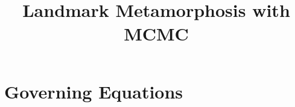 \documentclass{article}
\begin{document}
\title{Landmark Metamorphosis with MCMC}
\author{}
\maketitle

\section{Governing Equations}
\end{document}
